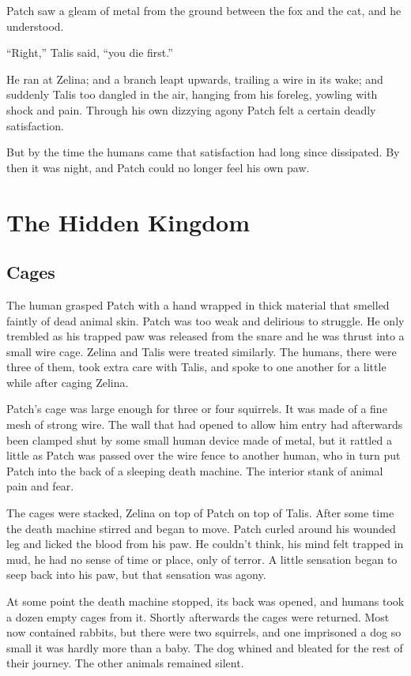 \documentclass[ebook,oneside,openany,17pt]{memoir}
\renewcommand{\thechapter}{\Roman{chapter}}
\newcounter{sections}
\newcommand{\sections}[1]{%
  \section*{#1}
  \addtocounter{sections}{1}%
  \pdfbookmark[1]{#1}{section.\thechapter.\thesections}}
\begin{document}
Patch saw a gleam of metal from the ground between the fox and the
cat, and he understood.

“Right,” Talis said, “you die first.”

He ran at Zelina; and a branch leapt upwards, trailing a wire in its
wake; and suddenly Talis too dangled in the air, hanging from his
foreleg, yowling with shock and pain. Through his own dizzying agony
Patch felt a certain deadly satisfaction.

But by the time the humans came that satisfaction had long since
dissipated. By then it was night, and Patch could no longer feel his
own paw.


\chapter{The Hidden Kingdom}

\sections{Cages}

The human grasped Patch with a hand wrapped in thick material that
smelled faintly of dead animal skin. Patch was too weak and delirious
to struggle. He only trembled as his trapped paw was released from the
snare and he was thrust into a small wire cage. Zelina and Talis were
treated similarly. The humans, there were three of them, took extra
care with Talis, and spoke to one another for a little while after
caging Zelina.

Patch’s cage was large enough for three or four squirrels. It was made
of a fine mesh of strong wire. The wall that had opened to allow him
entry had afterwards been clamped shut by some small human device made
of metal, but it rattled a little as Patch was passed over the wire
fence to another human, who in turn put Patch into the back of a
sleeping death machine. The interior stank of animal pain and fear.

The cages were stacked, Zelina on top of Patch on top of Talis. After
some time the death machine stirred and began to move. Patch curled
around his wounded leg and licked the blood from his paw. He couldn’t
think, his mind felt trapped in mud, he had no sense of time or place,
only of terror. A little sensation began to seep back into his paw,
but that sensation was agony.

At some point the death machine stopped, its back was opened, and
humans took a dozen empty cages from it. Shortly afterwards the cages
were returned. Most now contained rabbits, but there were two
squirrels, and one imprisoned a dog so small it was hardly more than a
baby. The dog whined and bleated for the rest of their journey. The
other animals remained silent.
\end{document}
